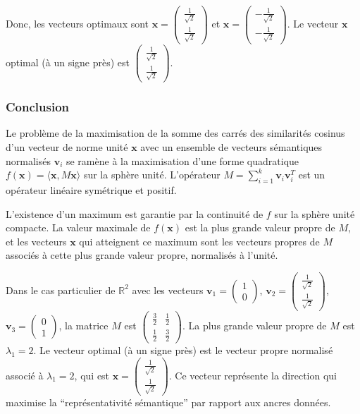 \documentclass[11pt,a4paper]{report}
\begin{document}
Donc, les vecteurs optimaux sont
\(\mathbf{x} = \begin{pmatrix} \frac{1}{\sqrt{2}} \\ \frac{1}{\sqrt{2}} \end{pmatrix}\)
et
\(\mathbf{x} = \begin{pmatrix} -\frac{1}{\sqrt{2}} \\ -\frac{1}{\sqrt{2}} \end{pmatrix}\).
Le vecteur \(\mathbf{x}\) optimal (à un signe près) est
\(\begin{pmatrix} \frac{1}{\sqrt{2}} \\ \frac{1}{\sqrt{2}} \end{pmatrix}\).

\hypertarget{conclusion}{%
\subsubsection{Conclusion}\label{conclusion}}

Le problème de la maximisation de la somme des carrés des similarités
cosinus d'un vecteur de norme unité \(\mathbf{x}\) avec un ensemble de
vecteurs sémantiques normalisés \(\mathbf{v}_i\) se ramène à la
maximisation d'une forme quadratique
\(f(\mathbf{x}) = \langle \mathbf{x}, M\mathbf{x} \rangle\) sur la
sphère unité. L'opérateur
\(M = \sum_{i=1}^k \mathbf{v}_i \mathbf{v}_i^T\) est un opérateur
linéaire symétrique et positif.

L'existence d'un maximum est garantie par la continuité de \(f\) sur la
sphère unité compacte. La valeur maximale de \(f(\mathbf{x})\) est la
plus grande valeur propre de \(M\), et les vecteurs \(\mathbf{x}\) qui
atteignent ce maximum sont les vecteurs propres de \(M\) associés à
cette plus grande valeur propre, normalisés à l'unité.

Dans le cas particulier de \(\mathbb{R}^2\) avec les vecteurs
\(\mathbf{v}_1 = \begin{pmatrix} 1 \\ 0 \end{pmatrix}\),
\(\mathbf{v}_2 = \begin{pmatrix} \frac{1}{\sqrt{2}} \\ \frac{1}{\sqrt{2}} \end{pmatrix}\),
\(\mathbf{v}_3 = \begin{pmatrix} 0 \\ 1 \end{pmatrix}\), la matrice
\(M\) est
\(\begin{pmatrix} \frac{3}{2} & \frac{1}{2} \\ \frac{1}{2} & \frac{3}{2} \end{pmatrix}\).
La plus grande valeur propre de \(M\) est \(\lambda_1 = 2\). Le vecteur
optimal (à un signe près) est le vecteur propre normalisé associé à
\(\lambda_1=2\), qui est
\(\mathbf{x} = \begin{pmatrix} \frac{1}{\sqrt{2}} \\ \frac{1}{\sqrt{2}} \end{pmatrix}\).
Ce vecteur représente la direction qui maximise la ``représentativité
sémantique'' par rapport aux ancres données.
\end{document}
